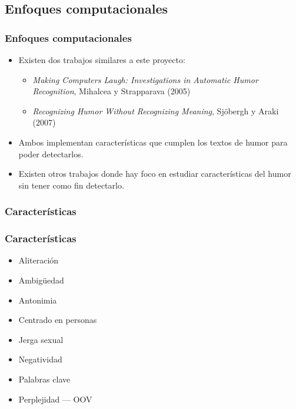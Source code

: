 \subsection{Enfoques computacionales}
\begin{frame}
    \frametitle{Enfoques computacionales}

    \begin{itemize}
        \item Existen dos trabajos similares a este proyecto:

        \begin{itemize}
            \item \emph{Making Computers Laugh: Investigations in Automatic Humor Recognition}, Mihalcea y Strapparava (2005)
            \item \emph{Recognizing Humor Without Recognizing Meaning}, Sjöbergh y Araki (2007)
        \end{itemize}

        \item Ambos implementan características que cumplen los textos de humor para poder detectarlos.

        \item Existen otros trabajos donde hay foco en estudiar características del humor sin tener como fin detectarlo.
    \end{itemize}
\end{frame}

\subsubsection{Características}

\begin{frame}
    \frametitle{Características}

    \begin{itemize}
        \item Aliteración
        \item Ambigüedad
        \item Antonimia
        \item Centrado en personas
        \item Jerga sexual
        \item Negatividad
        \item Palabras clave
        \item Perplejidad --- OOV
    \end{itemize}
\end{frame}

